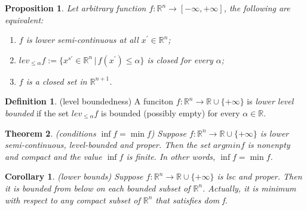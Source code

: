 \documentclass{jsarticle}
\newtheorem{thm}{Theorem}[section]
\newtheorem{cor}{Corollary}[thm]
\newtheorem{prop}[thm]{Proposition}
\theoremstyle{definition}
\newtheorem{dfn}{Definition}[section]
\begin{document}
\begin{prop}
Let arbitrary function $f: \mathbb{R}^n \to [- \infty, + \infty]$, the following are equivalent:

\begin{enumerate}
\renewcommand{\labelenumi}{(\roman{enumi})}
\item $f$ is lower semi-continuous at all $x^{\prime} \in \mathbb{R}^n$;
\item $lev_{\le \alpha} f := \{x^{s\prime} \in \mathbb{R}^n \, | \, f(x^{\prime}) \le \alpha \}$ is closed for every $\alpha$;
\item {}$f$ is a closed set in $\mathbb{R}^{n+1}$.
\end{enumerate}

\end{prop}

\begin{dfn}(level boundedness)
    A funciton  $f : \mathbb{R}^n \to \mathbb{R} \cup \{+ \infty \}$ is \textit{lower level bounded} 
    if the set $lev_{\le \alpha}{f}$ is bounded (possibly empty) for every $\alpha \in \mathbb{R}.$
\end{dfn}

\begin{thm}(conditions $\inf f = \min f$)
    Suppose $f : \mathbb{R}^n \to \mathbb{R} \cup \{+ \infty \}$ is lower semi-continuous, level-bounded and proper. 
    Then the set $argmin f$ is nonenpty and compact and the value $\inf f$ is finite.
    In other words, $\inf f = \min f$.
\end{thm}

\begin{cor}(lower bounds)
    Suppose $f: \mathbb{R}^n \to \mathbb{R} \cup \{+ \infty \}$ is lsc and proper.
    Then it is bounded from below on each bounded subset of $\mathbb{R}^n$. 
    Actually, it is minimum with respect to any compact subset of $\mathbb{R}^n$ that satisfies dom f.
\end{cor}


\section{}
\end{document}

